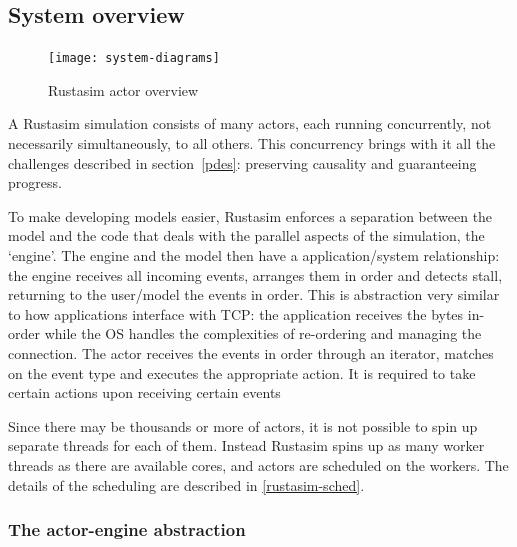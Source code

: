 \subsection{System overview} \label{rustasim-overview}

\begin{figure}[h]
\centering
\label{rustasim-overview:fig}
\texttt{[image: system-diagrams]}
\caption{Rustasim actor overview}
\end{figure}

A Rustasim simulation consists of many actors, each running concurrently, not necessarily simultaneously, to all others.
This concurrency brings with it all the challenges described in section\ \ref{pdes}: preserving causality and guaranteeing progress.

To make developing models easier, Rustasim enforces a separation between the model and the code that deals with the parallel aspects of the simulation, the `engine'.
The engine and the model then have a application/system relationship: the engine receives all incoming events, arranges them in order and detects stall, returning to the user/model the events in order.
This is abstraction very similar to how applications interface with TCP: the application receives the bytes in-order while the OS handles the complexities of re-ordering and managing the connection.
The actor receives the events in order through an iterator, matches on the event type and executes the appropriate action.
It is required to take certain actions upon receiving certain events

Since there may be thousands or more of actors, it is not possible to spin up separate threads for each of them.
Instead Rustasim spins up as many worker threads as there are available cores, and actors are scheduled on the workers.
The details of the scheduling are described in \ref{rustasim-sched}.



\subsubsection{The actor-engine abstraction} \label{rustasim-actor-engine}

